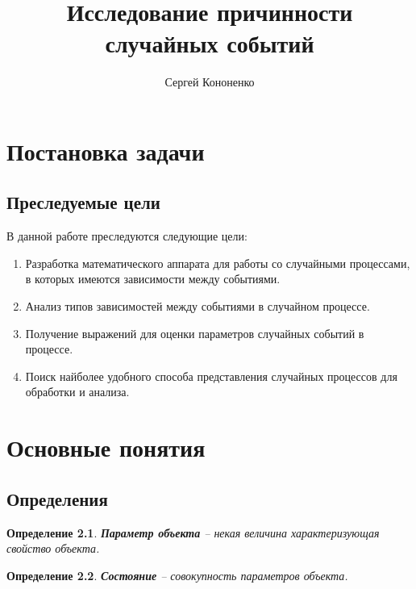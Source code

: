 \documentclass[a4paper,11pt]{report}
\title{Исследование причинности случайных событий}
\author{Сергей Кононенко}
\newtheorem{definition}{Определение}
\begin{document}
  \maketitle
  
  
  
  \tableofcontents
  
  
  
  \chapter{Постановка задачи}
  
    \section{Преследуемые цели}
    
      В данной работе преследуются следующие цели:
      
      \begin{enumerate}
          \item Разработка математического аппарата для работы со случайными процессами, в которых имеются зависимости между событиями.
      	\item Анализ типов зависимостей между событиями в случайном процессе.
      	\item Получение выражений для оценки параметров случайных событий в процессе.
      	\item Поиск найболее удобного способа представления случайных процессов для обработки и анализа.
      \end{enumerate}
      
      
    
  \chapter{Основные понятия}
  
    \section{Определения}

      \begin{definition}
        \textbf{Параметр объекта} -- некая величина характеризующая свойство объекта.
      \end{definition}
    
      \begin{definition}
        \textbf{Состояние} -- совокупность параметров объекта.
      \end{definition} 
         
\end{document}
